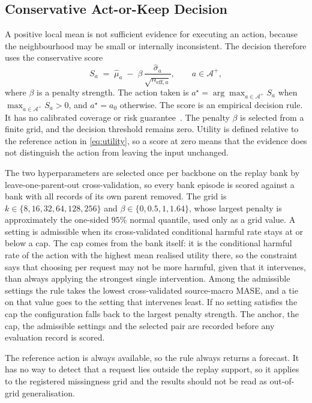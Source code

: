 \documentclass{article}
\newcommand{\calA}{\mathcal{A}}
\begin{document}
\subsection{Conservative Act-or-Keep Decision}
\label{sec:method-decision}
A positive local mean is not sufficient evidence for executing an action, because the
neighbourhood may be small or internally inconsistent. The decision therefore uses the
conservative score
\begin{equation}
  S_a \;=\; \hat\mu_a \;-\; \beta\, \frac{\hat\sigma_a}{\sqrt{n_{\mathrm{eff},a}}},
  \qquad a \in \calA^{+},
  \label{eq:score}
\end{equation}
where $\beta$ is a penalty strength. The action taken is
$a^{\star} = \arg\max_{a \in \calA^{+}} S_a$ when $\max_{a \in \calA^{+}} S_a > 0$, and
$a^{\star} = a_0$ otherwise.
The score is an empirical decision rule. It has no calibrated coverage or risk
guarantee~\citep{angelopoulos2024conformal}. The penalty $\beta$ is selected from a finite
grid, and the decision threshold remains zero.
Utility is defined relative to the reference action in \eqref{eq:utility}, so a score at zero
means that the evidence does not distinguish the action from leaving the input unchanged.

The two hyperparameters are selected once per backbone on the replay bank by
leave-one-parent-out cross-validation, so every bank episode is scored against a bank with all
records of its own parent removed. The grid is
$k \in \{8, 16, 32, 64, 128, 256\}$ and $\beta \in \{0, 0.5, 1, 1.64\}$, whose largest penalty
is approximately the one-sided $95\%$ normal quantile, used only as a grid value. A setting is admissible when its cross-validated
conditional harmful rate stays at or below a cap. The cap comes from the bank itself: it is
the
conditional harmful rate of the action with the highest mean realised utility there, so the
constraint says that choosing per request may not be more harmful, given that it intervenes,
than always applying the strongest single intervention. Among the admissible settings the rule
takes the lowest cross-validated source-macro MASE, and a tie on that value goes to the setting
that intervenes least. If no setting satisfies the cap the configuration falls back to the
largest penalty strength. The anchor, the cap, the admissible settings and the selected pair
are recorded before any evaluation record is scored.

The reference action is always available, so the rule always returns a forecast. It has no way
to detect that a request lies outside the replay support, so it applies to the registered
missingness grid and the results should not be read as out-of-grid generalisation.
\end{document}
